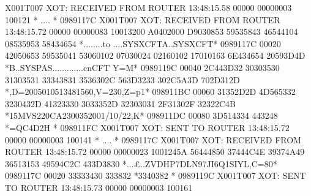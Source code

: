 \documentclass[letterpaper,10pt,english]{sphinxmanual}
\begin{document}
\begin{sphinxVerbatim}[commandchars=\\\{\}]
X001T007 XOT: RECEIVED FROM ROUTER                          13:48:15.58
00000 00000003 100121                                                         * ....                           * 0989117C
X001T007 XOT: RECEIVED FROM ROUTER                          13:48:15.72
00000 00000083 10013200 A0402000 D9030853 59535843 46544104 08535953 58434654 *........to ....SYSXCFTA..SYSXCFT* 0989117C
00020 42050653 59535041 53060102 07030024 02160102 17010163 6E434654 20593D4D *B..SYSPAS......\PYGZdl{}.......cnCFT Y=M* 0989119C
00040 2C443D32 30303530 31303531 33343831 3536302C 563D3233 302C5A3D 702D312D *,D=2005010513481560,V=230,Z=p\PYGZhy{}1\PYGZhy{}* 098911BC
00060 31352D2D 4D565332 3230432D 41323330 3033352D 32303031 2F31302F 32322C4B *15\PYGZhy{}\PYGZhy{}MVS220C\PYGZhy{}A230035\PYGZhy{}2001/10/22,K* 098911DC
00080 3D514334 443248                                                         *=QC4D2H                         * 098911FC
X001T007 XOT: SENT TO ROUTER                                13:48:15.72
00000 00000003 100141                                                         * ....                           * 0989117C
X001T007 XOT: RECEIVED FROM ROUTER 13:48:15.72
00000 00000023 1001245A 56444850 37444C4E 39374A49 36513153 49594C2C 433D3830 *...£..\PYGZdl{}ZVDHP7DLN97JI6Q1SIYL,C=80* 0989117C
00020 33333430 333832                                                         *3340382                         * 0989119C
X001T007 XOT: SENT TO ROUTER                                13:48:15.73
00000 00000003 100161
\end{sphinxVerbatim}

\end{document}
